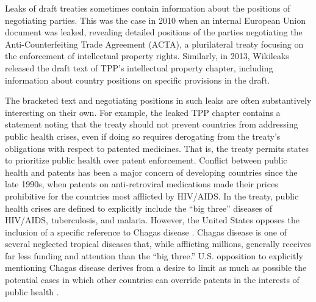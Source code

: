 \documentclass[12pt]{article}
\begin{document}
Leaks of draft treaties sometimes contain information about the positions 
of negotiating parties. This was the case in 2010 when an internal European Union document was 
leaked, revealing detailed positions of the parties negotiating the Anti-Counterfeiting 
Trade Agreement (ACTA), a plurilateral treaty focusing on the enforcement of intellectual property 
rights. Similarly, in 2013, Wikileaks released the draft text of TPP's intellectual property chapter, 
including information about country positions on specific provisions in the draft.

The bracketed text and negotiating positions in such leaks are often substantively interesting on 
their own. For example, the leaked TPP chapter contains a statement noting that the treaty should 
not prevent countries from addressing public health crises, even if doing so requires derogating from 
the treaty's obligations with respect to patented medicines. That is, the treaty permits states to 
prioritize public health over patent enforcement. Conflict between public health and patents has been 
a major concern of developing countries since the late 1990s, when patents on anti-retroviral medications 
made their prices prohibitive for the countries most afflicted by HIV/AIDS.
In the treaty, public health crises are defined to 
explicitly include the ``big three'' diseases of HIV/AIDS, tuberculosis, and malaria. 
However, the United States opposes the inclusion of a specific reference to Chagas disease \citep[Art. QQ.A.5(a)]{wikileaks2013wikileaks}. 
Chagas disease is one of several neglected tropical diseases that, while afflicting millions, 
generally receives far less funding and attention than the ``big three.'' U.S. opposition to 
explicitly mentioning Chagas disease derives from a desire to limit as much as possible 
the potential cases in which other countries can override patents in the interests of public 
health \citep[11]{government_accountability_office2007intellectual}.
\end{document}
